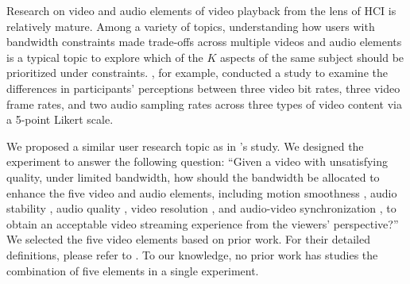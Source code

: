 Research on video and audio elements of video playback from the lens of HCI is relatively mature. Among a variety of topics, understanding how users with bandwidth constraints made trade-offs across multiple videos and audio elements \cite{molnar2013comedy, oeldorf2012bad} is a typical topic to explore which of the $K$ aspects of the same subject should be prioritized under constraints. \textcite{oeldorf2012bad}, for example, conducted a study to examine the differences in participants' perceptions between three video bit rates, three video frame rates, and two audio sampling rates across three types of video content via a 5-point Likert scale. 

We proposed a similar user research topic as in \textcite{oeldorf2012bad}'s study. We designed the experiment to answer the following question: ``Given a video with unsatisfying quality, under limited bandwidth, how should the bandwidth be allocated to enhance the five video and audio elements, including motion smoothness \cite{huynh2008temporal}, audio stability \cite{hardman1998successful}, audio quality \cite{knoche2008low}, video resolution \cite{knoche2005can}, and audio-video synchronization \cite{steinmetz1996human}, to obtain an acceptable video streaming experience from the viewers' perspective?'' We selected the five video elements based on prior work. For their detailed definitions, please refer to . To our knowledge, no prior work has studies the combination of five elements in a single experiment.

